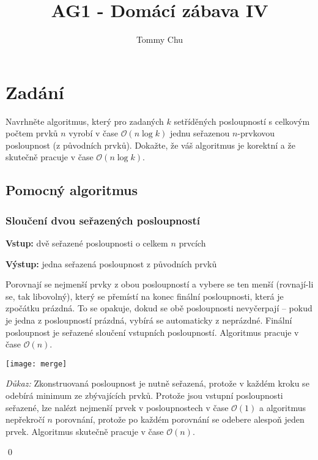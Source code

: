 \documentclass{article}
\title{AG1 - Domácí zábava IV}
\author{Tommy Chu}
\date{}
\begin{document}
\maketitle

\section{Zadání}

Navrhněte algoritmus, který pro zadaných $k$ setříděných posloupností s celkovým počtem prvků $n$ vyrobí v čase $\mathcal{O}(n \log k)$ jednu seřazenou $n$-prvkovou posloupnost (z původních prvků). Dokažte, že váš algoritmus je korektní a že skutečně pracuje v čase $\mathcal{O}(n \log k)$.

\subsection{Pomocný algoritmus}

\subsubsection*{Sloučení dvou seřazených posloupností}

\textbf{Vstup:} dvě seřazené posloupnosti o celkem $n$ prvcích

\textbf{Výstup:} jedna seřazená posloupnost z původních prvků

Porovnají se nejmenší prvky z obou posloupností a vybere se ten menší (rovnají-li se, tak libovolný), který se přemístí na konec finální posloupnosti, která je zpočátku prázdná. To se opakuje, dokud se obě posloupnosti nevyčerpají -- pokud je jedna z posloupností prázdná, vybírá se automaticky z neprázdné. Finální posloupnost je seřazené sloučení vstupních posloupností. Algoritmus pracuje v čase $\mathcal{O}(n)$.

\begin{center}
    \texttt{[image: merge]}
\end{center}

\textit{Důkaz:} Zkonstruovaná posloupnost je nutně seřazená, protože v každém kroku se odebírá minimum ze zbývajících prvků. Protože jsou vstupní posloupnosti seřazené, lze nalézt nejmenší prvek v posloupnostech v čase $\mathcal{O}(1)$ a algoritmus nepřekročí $n$ porovnání, protože po každém porovnání se odebere alespoň jeden prvek. Algoritmus skutečně pracuje v čase $\mathcal{O}(n)$.

\qed

\newpage
\end{document}
